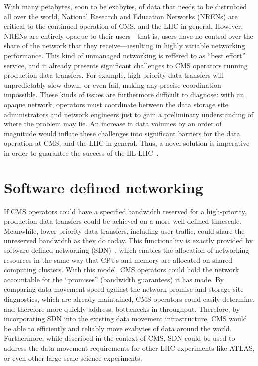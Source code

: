 With many petabytes, soon to be exabytes, of data that needs to be distrubted all over the world, National Research and Education Networks (NRENs) are critical to the continued operation of CMS, and the LHC in general. 
However, NRENs are entirely opaque to their users---that is, users have no control over the share of the network that they receive---resulting in highly variable networking performance. 
This kind of unmanaged networking is reffered to as ``best effort'' service, and it already presents significant challenges to CMS operators running production data transfers. 
For example, high priority data transfers will unpredictably slow down, or even fail, making any precise coordination impossible. 
These kinds of issues are furthermore difficult to diagnose: with an opaque network, operators must coordinate between the data storage site administrators and network engineers just to gain a preliminary understanding of where the problem may lie. 
An increase in data volumes by an order of magnitude would inflate these challenges into significant barriers for the data operation at CMS, and the LHC in general. 
Thus, a novel solution is imperative in order to guarantee the success of the HL-LHC~\cite{HEPSoftwareFoundation2017, Zurawski2021}. 

\section{Software defined networking}
If CMS operators could have a specified bandwidth reserved for a high-priority, production data transfers could be achieved on a more well-defined timescale. 
Meanwhile, lower priority data transfers, including user traffic, could share the unreserved bandwidth as they do today. 
This functionality is exactly provided by software defined networking (SDN)~\cite{SDNSurvey}, which enables the allocation of networking resources in the same way that CPUs and memory are allocated on shared computing clusters. 
With this model, CMS operators could hold the network accountable for the ``promises'' (bandwidth guarantees) it has made. 
By comparing data movement speed against the network promise and storage site diagnostics, which are already maintained, CMS operators could easily determine, and therefore more quickly address, bottlenecks in throughput. 
Therefore, by incorporating SDN into the existing data movement infrastructure, CMS would be able to efficiently and reliably move exabytes of data around the world. 
Furthermore, while described in the context of CMS, SDN could be used to address the data movement requirements for other LHC experiments like ATLAS, or even other large-scale science experiments. 

